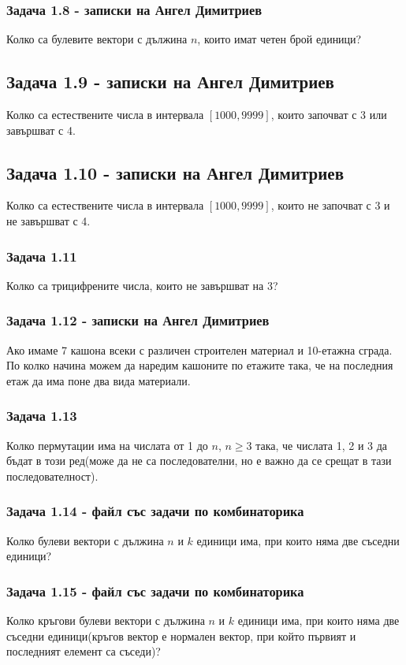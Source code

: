 \documentclass[12pt]{article}
\begin{document}
\subsubsection*{Задача 1.8 - записки на Ангел Димитриев}
Колко са булевите вектори с дължина $n$, които имат четен брой единици?
\subsection*{Задача 1.9 - записки на Ангел Димитриев}
Колко са естествените числа в интервала $[1000, 9999]$, които започват с 3 или завършват с 4.
\subsection*{Задача 1.10 - записки на Ангел Димитриев}
Колко са естествените числа в интервала $[1000, 9999]$, които не започват с 3 и не завършват с 4.
\subsubsection*{Задача 1.11}
Колко са трицифрените числа, които не завършват на 3?
\subsubsection*{Задача 1.12 - записки на Ангел Димитриев}
Ако имаме 7 кашона всеки с различен строителен материал и 10-етажна сграда. По колко начина можем да наредим кашоните по етажите така, че на последния етаж да има поне два вида материали.
\subsubsection*{Задача 1.13}
Колко пермутации има на числата от 1 до $n$, $n \geq 3$ така, че числата 1, 2 и 3 да бъдат в този ред(може да не са последователни, но е важно да се срещат в тази последователност). 
\subsubsection*{Задача 1.14 - файл със задачи по комбинаторика}
Колко булеви вектори с дължина $n$ и $k$ единици има, при които няма две съседни единици?
\subsubsection*{Задача 1.15 - файл със задачи по комбинаторика}
Колко кръгови булеви вектори с дължина $n$ и $k$ единици има, при които няма две съседни единици(кръгов вектор е нормален вектор, при който първият и последният елемент са съседи)?
\end{document}

